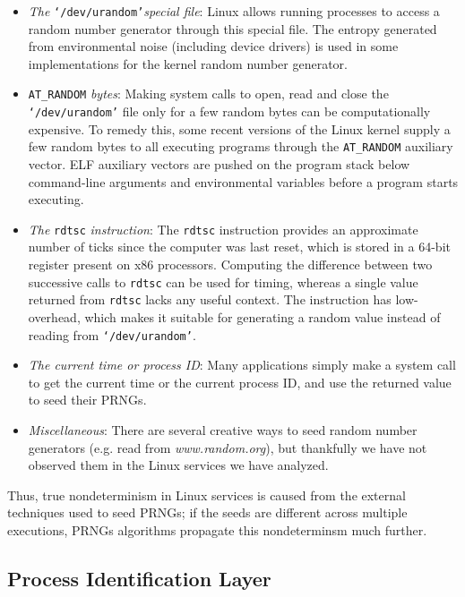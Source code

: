\begin{itemize}

\item {\em The} \texttt{`/dev/urandom'}{\em special file}: Linux allows
running processes to access a random number generator through this
special file. The entropy generated from environmental noise (including
device drivers) is used in some implementations for the kernel random number generator.

\item \texttt{AT\_RANDOM} {\em bytes}: 
Making system calls to open, read and close the
\texttt{`/dev/urandom'} file only for a
few random bytes can be computationally expensive. To
remedy this, some 
recent versions of the Linux kernel supply
a few random bytes to all executing programs
through the \texttt{AT\_RANDOM} auxiliary vector.
ELF auxiliary vectors are pushed on the program
stack below command-line arguments and environmental
variables before a program starts executing.

\item {\em The} \texttt{rdtsc} {\em instruction}:
The \texttt{rdtsc} instruction provides an approximate number of ticks since
the computer was last reset, which is stored in a 64-bit register present
on x86 processors. Computing the difference between two successive
calls to \texttt{rdtsc} can be used for timing, whereas a single
value returned from \texttt{rdtsc} lacks any useful context.  
The instruction has low-overhead, which makes it suitable for generating a random value
instead of reading from \texttt{`/dev/urandom'}. 

\item {\em The current time or process ID}: Many applications simply make a system call
to get the current time or the current process ID, and use the returned value to seed their PRNGs. 

\item {\em Miscellaneous}: There
are several creative ways to seed random number
generators (e.g. read from {\em www.random.org}),
but thankfully we have not observed them
in the Linux services we have analyzed.
\end{itemize}

Thus, true nondeterminism in Linux services is caused
from the external techniques used to seed PRNGs;
if the seeds are different across multiple
executions, PRNGs algorithms propagate this
nondeterminsm much further.

\subsection{Process Identification Layer} \label{ch3:pid}

